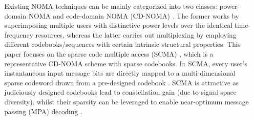 \documentclass[journal]{IEEEtran}
\begin{document}
 
 
 
 
 
 

 


Existing NOMA techniques can be mainly categorized into two classes: power-domain NOMA \cite{islam2016power}  and code-domain NOMA (CD-NOMA)  \cite{liu2021sparse}. The former works by superimposing multiple users with distinctive  power levels over the  identical time-frequency resources, whereas the latter carries out multiplexing  by employing different  codebooks/sequences with certain intrinsic structural properties. 
This paper focuses on  the sparse code multiple access (SCMA) \cite{taherzadeh2014scma, hoshyar2008novel }, which is a  representative CD-NOMA scheme with sparse codebooks. In SCMA, every user's  instantaneous input message bits  are directly mapped to a multi-dimensional sparse codeword drawn   from a pre-designed codebook \cite{luo2021error}.  
 SCMA is attractive as judiciously designed codebooks lead to constellation gain (due to signal space diversity), whilst their sparsity can be leveraged to enable near-optimum  message passing (MPA) decoding \cite{hoshyar2008novel}.
 
\end{document}
